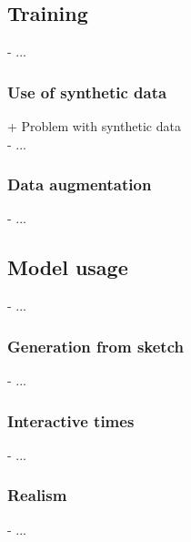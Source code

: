 \subsection{Training}
- ...

\subsubsection{Use of synthetic data}
+ Problem with synthetic data \\
- ...

\subsubsection{Data augmentation}
- ...

\subsection{Model usage}
- ...

\subsubsection{Generation from sketch}
- ...

\subsubsection{Interactive times}
- ...

\subsubsection{Realism}
- ...
